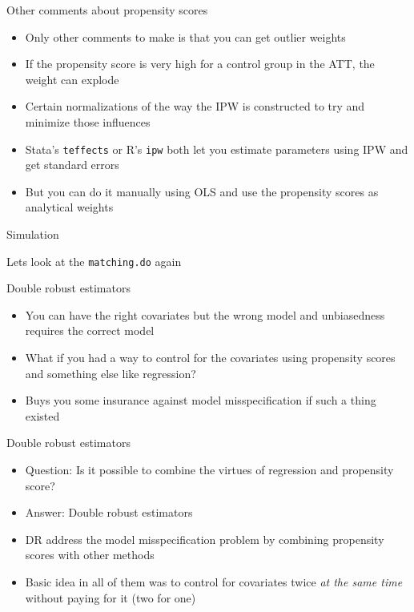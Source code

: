 \documentclass{beamer}
\begin{document}
\begin{frame}{Other comments about propensity scores}

\begin{itemize}

\item Only other comments to make is that you can get outlier weights
\item If the propensity score is very high for a control group in the ATT, the weight can explode
\item Certain normalizations of the way the IPW is constructed to try and minimize those influences
\item Stata's \texttt{teffects} or R's \texttt{ipw} both let you estimate parameters using IPW and get standard errors
\item But you can do it manually using OLS and use  the propensity scores as analytical weights

\end{itemize}

\end{frame}

\begin{frame}{Simulation}

Lets look at the \texttt{matching.do} again

\end{frame}


\begin{frame}{Double robust estimators}

\begin{itemize}
\item You can have the right covariates but the wrong model and unbiasedness requires the correct model
\item What if you had a way to control for the covariates using propensity scores and something else like regression?
\item Buys you some insurance against model misspecification if such a thing existed
\end{itemize}

\end{frame}

\begin{frame}{Double robust estimators}

\begin{itemize}
\item Question: Is it possible to combine the virtues of regression and propensity score?
\item Answer: Double robust estimators
\item DR address the model misspecification problem by combining propensity scores with other methods 
\item Basic idea in all of them was to control for covariates twice \emph{at the same time} without paying for it (two for one)
\end{itemize}

\end{frame}
\end{document}

